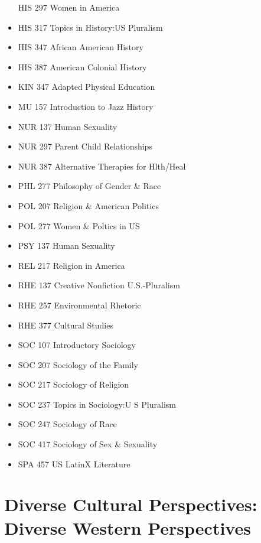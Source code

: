 \documentclass[
  letterpaper,
]{scrbook}
\begin{document}
\begin{itemize}
  HIS 297 Women in America\\
\item
  HIS 317 Topics in History:US Pluralism\\
\item
  HIS 347 African American History
\item
  HIS 387 American Colonial History
\item
  KIN 347 Adapted Physical Education
\item
  MU 157 Introduction to Jazz History
\item
  NUR 137 Human Sexuality\\
\item
  NUR 297 Parent Child Relationships\\
\item
  NUR 387 Alternative Therapies for Hlth/Heal
\item
  PHL 277 Philosophy of Gender \& Race
\item
  POL 207 Religion \& American Politics
\item
  POL 277 Women \& Poltics in US
\item
  PSY 137 Human Sexuality\\
\item
  REL 217 Religion in America\\
\item
  RHE 137 Creative Nonfiction U.S.-Pluralism
\item
  RHE 257 Environmental Rhetoric\\
\item
  RHE 377 Cultural Studies\\
\item
  SOC 107 Introductory Sociology\\
\item
  SOC 207 Sociology of the Family\\
\item
  SOC 217 Sociology of Religion
\item
  SOC 237 Topics in Sociology:U S Pluralism
\item
  SOC 247 Sociology of Race
\item
  SOC 417 Sociology of Sex \& Sexuality
\item
  SPA 457 US LatinX Literature
\end{itemize}

\hypertarget{sec-diverse-cultural-perspectives-western}{%
\section{Diverse Cultural Perspectives: Diverse Western
Perspectives}\label{sec-diverse-cultural-perspectives-western}}
\end{document}
